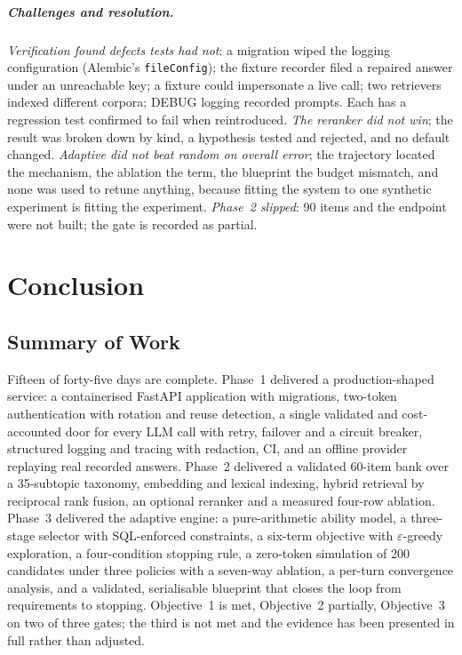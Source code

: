\documentclass{tietreport}
\begin{document}
\paragraph{Challenges and resolution.} \emph{Verification found defects tests had not}: a
migration wiped the logging configuration (Alembic's \texttt{fileConfig}); the fixture recorder
filed a repaired answer under an unreachable key; a fixture could impersonate a live call; two
retrievers indexed different corpora; DEBUG logging recorded prompts. Each has a regression test
confirmed to fail when reintroduced. \emph{The reranker did not win}; the result was broken down
by kind, a hypothesis tested and rejected, and no default changed. \emph{Adaptive did not beat
random on overall error}; the trajectory located the mechanism, the ablation the term, the
blueprint the budget mismatch, and none was used to retune anything, because fitting the system
to one synthetic experiment is fitting the experiment. \emph{Phase~2 slipped}: 90 items and the
endpoint were not built; the gate is recorded as partial.

\chapter{Conclusion}
\label{ch:conclusion}

\section{Summary of Work}

Fifteen of forty-five days are complete. Phase~1 delivered a production-shaped service: a
containerised FastAPI application with migrations, two-token authentication with rotation and
reuse detection, a single validated and cost-accounted door for every LLM call with retry,
failover and a circuit breaker, structured logging and tracing with redaction, CI, and an
offline provider replaying real recorded answers. Phase~2 delivered a validated 60-item bank
over a 35-subtopic taxonomy, embedding and lexical indexing, hybrid retrieval by reciprocal rank
fusion, an optional reranker and a measured four-row ablation. Phase~3 delivered the adaptive
engine: a pure-arithmetic ability model, a three-stage selector with SQL-enforced constraints,
a six-term objective with $\varepsilon$-greedy exploration, a four-condition stopping rule, a
zero-token simulation of 200 candidates under three policies with a seven-way ablation, a
per-turn convergence analysis, and a validated, serialisable blueprint that closes the loop from
requirements to stopping. Objective~1 is met, Objective~2 partially, Objective~3 on two of three
gates; the third is not met and the evidence has been presented in full rather than adjusted.
\end{document}
